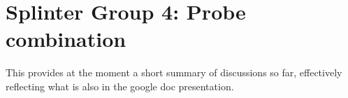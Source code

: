 
\section{Splinter Group 4: Probe combination}

This provides at the moment a short summary of discussions so far, effectively
reflecting what is also in the google doc presentation.

